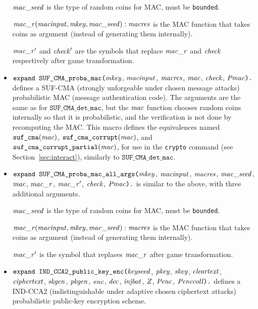 \documentclass{article}
\begin{document}
\begin{itemize}
  $\mathit{mac\_seed}$ is the type of random coins for MAC, must be \texttt{bounded}.

  $\mathit{mac\_r}(\mathit{macinput}, \mathit{mkey}, \mathit{mac\_seed}): \mathit{macres}$ is the MAC function that takes coins as argument (instead of generating them internally).

  $\mathit{mac\_r}'$ and $\mathit{check}'$ are the symbols that replace $\mathit{mac\_r}$ and $\mathit{check}$ respectively after game transformation.

\item $\texttt{expand SUF\_CMA\_proba\_mac(}\mathit{mkey}$,
$  \mathit{macinput}$, $\mathit{macres}$, $\mathit{mac}$, $\mathit{check}$,
$  \mathit{Pmac}\texttt{).}$ defines a SUF-CMA (strongly unforgeable under
  chosen message attacks) probabilistic MAC (message authentication code). 
  The arguments are the same as for $\texttt{SUF\_CMA\_det\_mac}$, but the $\mathit{mac}$ function chooses random
  coins internally so that it is probabilistic, and the verification is not done by recomputing the MAC.
  This macro defines the equivalences named
   $\texttt{suf\_cma}(\mathit{mac})$,
   $\texttt{suf\_cma\_corrupt}(\mathit{mac})$, and
   $\texttt{suf\_cma\_corrupt\_partial}(\mathit{mac})$, for use in the
   \texttt{crypto} command (see Section~\ref{sec:interact}),
   similarly to $\texttt{SUF\_CMA\_det\_mac}$.

\item $\texttt{expand SUF\_CMA\_proba\_mac\_all\_args(}\mathit{mkey}$,
$  \mathit{macinput}$, $\mathit{macres}$, $\mathit{mac\_seed}$, $\mathit{mac}$, $\mathit{mac\_r}$, $\mathit{mac\_r}'$, $\mathit{check}$, 
  $\mathit{Pmac}\texttt{).}$ is similar to the above,
  with three additional arguments. 

  $\mathit{mac\_seed}$ is the type of random coins for MAC, must be \texttt{bounded}.

  $\mathit{mac\_r}(\mathit{macinput}, \mathit{mkey}, \mathit{mac\_seed}): \mathit{macres}$ is the MAC function that takes coins as argument (instead of generating them internally).

  $\mathit{mac\_r}'$ is the symbol that replaces $\mathit{mac\_r}$ after game transformation.

\item $\texttt{expand IND\_CCA2\_public\_key\_enc(}\mathit{keyseed}$, $\mathit{pkey}$, $\mathit{skey}$,
$  \mathit{cleartext}$, $\mathit{ciphertext}$, $\mathit{skgen}$, $\mathit{pkgen}$, $\mathit{enc}$, $\mathit{dec}$, $\mathit{injbot}$, $\mathit{Z}$, $\mathit{Penc}$, $\mathit{Penccoll}\texttt{).}$ defines a
  IND-CCA2 (indistinguishable under adaptive chosen ciphertext attacks)
  probabilistic public-key encryption scheme.


\end{itemize}
\end{document}
